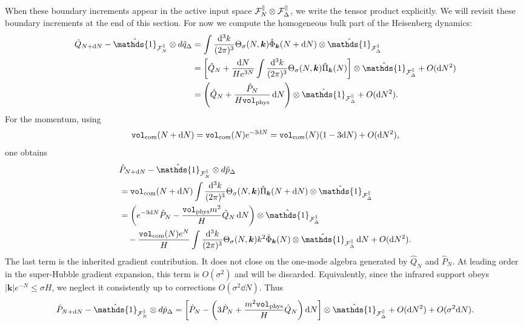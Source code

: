 \documentclass{article}
\def\cF{{\cal F}}
\newcommand{\openone}{\hat{\mathds{1}}}
\newcommand{\VF}{\mathtt{vol}_{\rm com}}
\newcommand{\Vphys}{\mathtt{vol}_{\rm phys}}
\newcommand{\hvarphi}{\hat{\Phi}}
\newcommand{\hpi}{\hat{\Pi}}
\numberwithin{equation}{section}
\begin{document}
	When these boundary increments appear in the active input space \(\cF_N^\parallel\otimes\cF_\Delta^\parallel\), we write the tensor product explicitly. We will revisit these boundary increments at the end of this section. For now we compute the homogeneous bulk part of the Heisenberg dynamics:
	\begin{align}
		\hat Q_{N+\dd N}-\openone_{\cF_N^\parallel}\otimes d\hat q_\Delta &= \int\frac{\dd^3k}{(2\pi)^3} \Theta_\sigma(N,\bm k)\hvarphi_{\bm k}(N+\dd N) \otimes \openone_{\cF_\Delta^\parallel} \nonumber\\ &= \left[ \hat Q_N + \frac{\dd N}{H e^{3N}} \int\frac{\dd^3k}{(2\pi)^3} \Theta_\sigma(N,\bm k)\hpi_{\bm k}(N) \right] \otimes \openone_{\cF_\Delta^\parallel} + O(\dd N^2) \nonumber\\ &= \left( \hat Q_N + \frac{\hat P_N}{H\Vphys}\,\dd N \right) \otimes \openone_{\cF_\Delta^\parallel} + O(\dd N^2).
		\label{eq:inputQWithIRApp}
	\end{align}
	For the momentum, using
	\begin{equation}
		\VF(N+\dd N) = \VF(N)e^{-3\dd N} = \VF(N)(1-3\dd N)+O(\dd N^2),
		\label{eq:VFexpandApp}
	\end{equation}
	one obtains
	\begin{align}
		&\hat P_{N+\dd N}-\openone_{\cF_N^\parallel}\otimes d\hat p_\Delta \nonumber\\ &= \VF(N+\dd N) \int\frac{\dd^3k}{(2\pi)^3} \Theta_\sigma(N,\bm k)\hpi_{\bm k}(N+\dd N) \otimes \openone_{\cF_\Delta^\parallel} \nonumber\\ &= \left( e^{-3\dd N}\hat P_N - \frac{\Vphys m^2}{H}\hat Q_N\,\dd N \right) \otimes \openone_{\cF_\Delta^\parallel} \nonumber\\ &\quad - \frac{\VF(N)e^N}{H} \int\frac{\dd^3k}{(2\pi)^3} \Theta_\sigma(N,\bm k)k^2\hvarphi_{\bm k}(N) \otimes \openone_{\cF_\Delta^\parallel}\,\dd N + O(\dd N^2).
		\label{eq:inputSectorWithGradientApp}
	\end{align}
	The last term is the inherited gradient contribution. It does not close on the one-mode algebra generated by \(\hat Q_N\) and \(\hat P_N\). At leading order in the super-Hubble gradient expansion, this term is \(O(\sigma^2)\) and will be discarded. Equivalently, since the infrared support obeys \(|\bm k|e^{-N}\leq \sigma H\), we neglect it consistently up to corrections \(O(\sigma^2 \dd N)\). Thus
	\begin{equation}
		\hat P_{N+\dd N}-\openone_{\cF_N^\parallel}\otimes d\hat p_\Delta = \left[ \hat P_N - \left( 3\hat P_N+\frac{m^2\Vphys}{H}\hat Q_N \right)\dd N \right] \otimes \openone_{\cF_\Delta^\parallel} + O(\dd N^2) + O(\sigma^2 \dd N).
		\label{eq:inputSectorWithIRApp}
	\end{equation}
\end{document}
